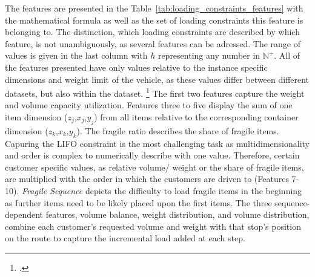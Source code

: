 The features are presented in the Table~\ref{tab:loading_constraints_features} with the mathematical formula as well as the set of
loading constraints this feature is belonging to. The distinction, which loading constraints are described by which feature, is not
unambiguously, as several features can be adressed. The range of values is given in the last column with $h$ representing any number in $\mathbb{N}^{+}$.
All of the features presented have only values relative to the instance specific dimensions and weight limit of the vehicle, as these values
differ between different datasets, but also within the \gendreauDataSetText dataset. \footcite[cf.][p. 346]{gendreau_tabu_2006}
The first two features capture the weight and volume capacity utilization. Features three to five display the sum of one item dimension ($z_j$,$x_j$,$y_j$)
from all items relative to the corresponding container dimension ($z_k$,$x_k$,$y_k$). The fragile ratio describes the share of fragile
items. Capuring the \gls{LIFO} constraint is the most challenging task as multidimensionality and order is complex to numerically describe
with one value. Therefore, certain customer specific values, as relative volume/ weight or the share of fragile items, are multiplied
with the order in which the customers are driven to (Features 7-10). \textit{Fragile Sequence} depicts the difficulty to load fragile items
in the beginning as further items need to be likely placed upon the first items. The three sequence-dependent features, volume balance,
weight distribution, and volume distribution, combine each customer’s requested volume and weight with that stop’s position on
the route to capture the incremental load added at each step.
